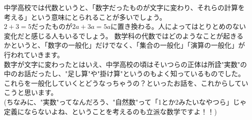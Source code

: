 中学高校では代数というと、「数字だったものが文字に変わり、それらの計算を考える」という意味にとられることが多いでしょう。\\
$2 + 3 = 5$だったものが$2a + 3a = 5a$に置き換わる。人によってはとりとめのない変化だと感じる人もいるでしょう。
数学科の代数ではどのようなことが起きるかというと、「数字の一般化」だけでなく、「集合の一般化」「演算の一般化」が行われていきます。\\
数字が文字に変わったとはいえ、中学高校の頃はそいつらの正体は所詮"実数"の中のお話だったし、"足し算"や"掛け算"というのもよく知っているものでした。これらを一般化していくとどうなっちゃうの？といったお話を、これからしていこうと思います。\\
(ちなみに、"実数"ってなんだろう、"自然数"って「1とか2みたいなやつら」じゃ定義にならないよね、ということを考えるのも立派な数学ですよ！！)

